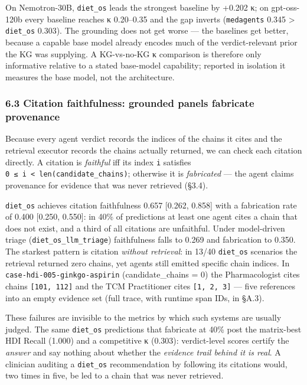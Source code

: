 \documentclass[
]{article}
\begin{document}
On Nemotron-30B, \texttt{diet\_os} leads the strongest baseline by
+0.202 κ; on gpt-oss-120b every baseline reaches κ 0.20--0.35 and the
gap inverts (\texttt{medagents} 0.345 \textgreater{} \texttt{diet\_os}
0.303). The grounding does not get worse --- the baselines get better,
because a capable base model already encodes much of the
verdict-relevant prior the KG was supplying. A KG-vs-no-KG κ comparison
is therefore only informative relative to a stated base-model
capability; reported in isolation it measures the base model, not the
architecture.

\hypertarget{citation-faithfulness-grounded-panels-fabricate-provenance}{%
\subsubsection{6.3 Citation faithfulness: grounded panels fabricate
provenance}\label{citation-faithfulness-grounded-panels-fabricate-provenance}}

Because every agent verdict records the indices of the chains it cites
and the retrieval executor records the chains actually returned, we can
check each citation directly. A citation is \emph{faithful} iff its
index \texttt{i} satisfies
\texttt{0\ ≤\ i\ \textless{}\ len(candidate\_chains)}; otherwise it is
\emph{fabricated} --- the agent claims provenance for evidence that was
never retrieved (§3.4).

\texttt{diet\_os} achieves citation faithfulness 0.657 {[}0.262,
0.858{]} with a fabrication rate of 0.400 {[}0.250, 0.550{]}: in 40\% of
predictions at least one agent cites a chain that does not exist, and a
third of all citations are unfaithful. Under model-driven triage
(\texttt{diet\_os\_llm\_triage}) faithfulness falls to 0.269 and
fabrication to 0.350. The starkest pattern is citation \emph{without
retrieval}: in 13/40 \texttt{diet\_os} scenarios the retrieval returned
zero chains, yet agents still emitted specific chain indices. In
\texttt{case-hdi-005-ginkgo-aspirin} (candidate\_chains = 0) the
Pharmacologist cites chains \texttt{{[}101,\ 112{]}} and the TCM
Practitioner cites \texttt{{[}1,\ 2,\ 3{]}} --- five references into an
empty evidence set (full trace, with runtime span IDs, in §A.3).

These failures are invisible to the metrics by which such systems are
usually judged. The same \texttt{diet\_os} predictions that fabricate at
40\% post the matrix-best HDI Recall (1.000) and a competitive κ
(0.303): verdict-level scores certify the \emph{answer} and say nothing
about whether the \emph{evidence trail behind it is real}. A clinician
auditing a \texttt{diet\_os} recommendation by following its citations
would, two times in five, be led to a chain that was never retrieved.
\end{document}
